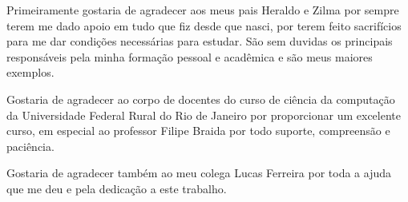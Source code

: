 Primeiramente gostaria de agradecer aos meus pais Heraldo e Zilma por sempre terem me dado apoio em tudo que fiz desde que nasci, por terem feito sacrifícios para me dar condições necessárias para estudar. São sem duvidas os principais responsáveis pela minha formação pessoal e acadêmica e são meus maiores exemplos.

Gostaria de agradecer ao corpo de docentes do curso de ciência da computação da Universidade Federal Rural do Rio de Janeiro por proporcionar um excelente curso, em especial ao professor Filipe Braida por todo suporte, compreensão e paciência.

Gostaria de agradecer também ao meu colega Lucas Ferreira por toda a ajuda que me deu e pela dedicação a este trabalho.